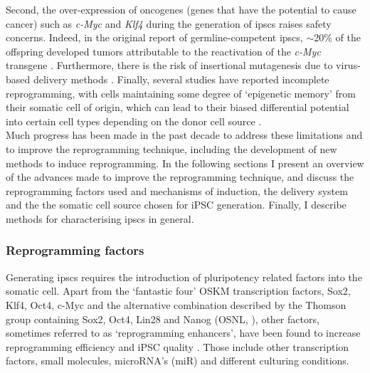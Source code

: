 Second, the over-expression of oncogenes (genes that have the potential to cause cancer) such as \textit{c-Myc} and \textit{Klf4} during the generation of \glspl{ipsc} raises safety concerns.
Indeed, in the original report of germline-competent \glspl{ipsc}, $\sim$20\% of the offspring developed tumors attributable to the reactivation of the \textit{c-Myc} transgene \cite{okita2007generation}. 
Furthermore, there is the risk of insertional mutagenesis due to virus-based delivery methods \cite{takahashi2006induction, takahashi2007induction, yu2007induced}. 
Finally, several studies have reported incomplete reprogramming, with cells maintaining some degree of `epigenetic memory' from their somatic cell of origin, which can lead to their biased differential potential into certain cell types depending on the donor cell source \cite{kim2010epigenetic, polo2010cell}.\\

Much progress has been made in the past decade to address these limitations and to improve the reprogramming technique, including the development of new methods to induce reprogramming. 
In the following sections I present an overview of the advances made to improve the reprogramming technique, and discuss the reprogramming factors used and mechanisms of induction, the delivery system and the the somatic cell source chosen for iPSC generation.
Finally, I describe methods for characterising \glspl{ipsc} in general. 
\subsubsection{Reprogramming factors}

Generating \glspl{ipsc} requires the introduction of pluripotency related factors into the somatic cell. 
Apart from the `fantastic four' OSKM transcription factors, Sox2, Klf4, Oct4, c-Myc and the alternative combination described by the Thomson group containing Sox2, Oct4, Lin28 and Nanog (OSNL, \cite{yu2007induced}), other factors, sometimes referred to as `reprogramming enhancers', have been found to increase reprogramming efficiency and iPSC quality \cite{takahashi2016decade}.
Those include other transcription factors, small molecules, microRNA’s (miR) and different culturing conditions. 

